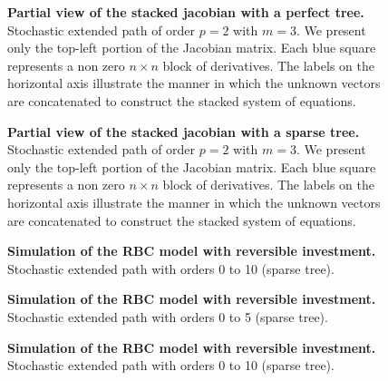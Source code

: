 \documentclass[a4paper,11pt]{amsart}
\begin{document}
\begin{figure}[H]
   \centering
   \hspace*{-0.8cm}\scalebox{.85}{}
   \caption{\textbf{Partial view of the stacked jacobian with a perfect tree.} Stochastic extended path of order $p=2$ with $m=3$. We present only the top-left portion of the Jacobian matrix. Each blue square represents a non zero $n\times n$ block of derivatives. The labels on the horizontal axis illustrate the manner in which the unknown vectors are concatenated to construct the stacked system of equations.}
   \label{fig:jacobian:perfect-tree}
\end{figure}


\begin{figure}[H]
   \centering
   \hspace*{-0.4cm}\scalebox{.85}{}
   \caption{\textbf{Partial view of the stacked jacobian with a sparse tree.} Stochastic extended path of order $p=2$ with $m=3$. We present only the top-left portion of the Jacobian matrix. Each blue square represents a non zero $n\times n$ block of derivatives. The labels on the horizontal axis illustrate the manner in which the unknown vectors are concatenated to construct the stacked system of equations.}
   \label{fig:jacobian:sparse-tree}
\end{figure}


\begin{figure}[H]
   \centering
   \begin{center}
      \scalebox{.5}{
         }
   \end{center}
   \caption{\textbf{Simulation of the RBC model with reversible investment.} Stochastic extended path with orders 0 to 10 (sparse tree).}
   \label{fig:rbc:reversible-investment}
\end{figure}


\begin{figure}[H]
   \centering
   \begin{center}
      \scalebox{.5}{
         }
   \end{center}
   \caption{\textbf{Simulation of the RBC model with reversible investment.} Stochastic extended path with orders 0 to 5 (sparse tree).}
   \label{fig:rbc:irreversible-investment-all}
\end{figure}


\begin{figure}[H]
   \centering
   \begin{center}
      \scalebox{.5}{
         }
   \end{center}
   \caption{\textbf{Simulation of the RBC model with reversible investment.} Stochastic extended path with orders 0 to 10 (sparse tree).}
   \label{fig:rbc:irreversible-investment-short}
\end{figure}
\end{document}
